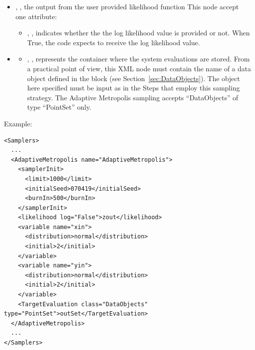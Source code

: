 \begin{itemize}
  \item {}, , the output from the user provided likelihood function
  This node accept one attribute:
  \begin{itemize}
    \item {}, , indicates whether the the log likelihood value is
    provided or not. When True, the code expects to receive the log likelihood value.
  \end{itemize}
  \item {}
  \begin{itemize}
    \item {}, ,
      represents the container where the system evaluations are stored.
      From a practical point of view, this XML node must contain the name of
      a data object defined in the  block (see
      Section~\ref{sec:DataObjects}). The object here specified must be
      input as   in the Steps that employ this sampling strategy.
      The Adaptive Metropolis sampling accepts ``DataObjects'' of type
      ``PointSet'' only.
  \end{itemize}
\end{itemize}

Example:
\begin{lstlisting}[style=XML]
<Samplers>
  ...
  <AdaptiveMetropolis name="AdaptiveMetropolis">
    <samplerInit>
      <limit>1000</limit>
      <initialSeed>070419</initialSeed>
      <burnIn>500</burnIn>
    </samplerInit>
    <likelihood log="False">zout</likelihood>
    <variable name="xin">
      <distribution>normal</distribution>
      <initial>2</initial>
    </variable>
    <variable name="yin">
      <distribution>normal</distribution>
      <initial>2</initial>
    </variable>
    <TargetEvaluation class="DataObjects" type="PointSet">outSet</TargetEvaluation>
  </AdaptiveMetropolis>
  ...
</Samplers>
\end{lstlisting}
